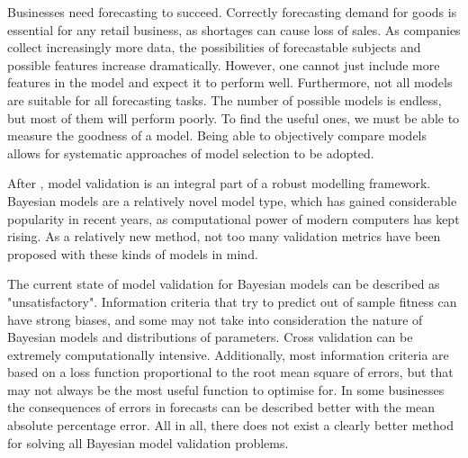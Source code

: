 \documentclass[english, 12pt, a4paper, sci, utf8, a-1b, online]{aaltothesis}
\begin{document}
\begin{abstractpage}[english]







Businesses need forecasting to succeed. Correctly forecasting demand for goods is essential for any retail business, as shortages can cause loss of sales. As companies collect increasingly more data, the possibilities of forecastable subjects and possible features increase dramatically. However, one cannot just include more features in the model and expect it to perform well. Furthermore, not all models are suitable for all forecasting tasks. The number of possible models is endless, but most of them will perform poorly. To find the useful ones, we must be able to measure the goodness of a model. Being able to objectively compare models allows for systematic approaches of model selection to be adopted.

After \cite{BDA}, model validation is an integral part of a robust modelling framework. Bayesian models are a relatively novel model type, which has gained considerable popularity in recent years, as computational power of modern computers has kept rising. As a relatively new method, not too many validation metrics have been proposed with these kinds of models in mind.

The current state of model validation for Bayesian models can be described as "unsatisfactory". Information criteria that try to predict out of sample fitness can have strong biases, and some may not take into consideration the nature of Bayesian models and distributions of parameters. Cross validation can be extremely computationally intensive. Additionally, most information criteria are based on a loss function proportional to the root mean square of errors, but that may not always be the most useful function to optimise for. In some businesses the consequences of errors in forecasts can be described better with the mean absolute percentage error. All in all, there does not exist a clearly better method for solving all Bayesian model validation problems.


\end{abstractpage}
\end{document}
